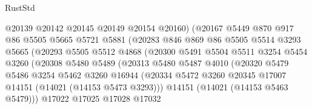 \begin{lexlean}{RustStd}
\begin{coremodule}
                              @20139
                              @20142
                              @20145
                              @20149
                              @20154
                              @20160)
                            (@20167
                              @5449
                              @870
                              @917
                              @86
                              @5505
                              @5665
                              @5721
                              @5881
                              (@20283
                                @846
                                @869
                                @86
                                @5505
                                @5514
                                @3293
                                @5665
                                (@20293
                                  @5505
                                  @5512
                                  @4868
                                  (@20300
                                    @5491
                                    @5504
                                    @5511
                                    @3254
                                    @5454
                                    @3260
                                    (@20308
                                      @5480
                                      @5489
                                      (@20313
                                        @5480
                                        @5487
                                        @4010
                                        (@20320
                                          @5479
                                          @5486
                                          @3254
                                          @5462
                                          @3260
                                          @16944
                                          (@20334
                                            @5472
                                            @3260
                                            @20345
                                            @17007
                                            @14151
                                            (@14021 (@14153 @5473 @3293)))
                                          @14151
                                          (@14021 (@14153 @5463 @5479)))
                                        @17022
                                        @17025
                                        @17028
                                        @17032

\end{coremodule}
\end{lexlean}
